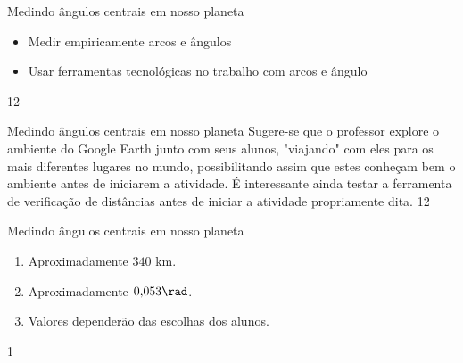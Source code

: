 \clearpage
\def\currentcolor{session2}
\begin{objectives}{Medindo ângulos centrais em nosso planeta}
{
\begin{itemize}
\item Medir empiricamente arcos e ângulos
\item Usar ferramentas tecnológicas no trabalho com arcos e ângulo
\end{itemize}
}{1}{2}
\end{objectives}
\begin{sugestions}{Medindo ângulos centrais em nosso planeta}
{
Sugere-se que o professor explore o ambiente do Google Earth junto com seus alunos, "viajando" com eles para os mais diferentes lugares no mundo, possibilitando assim que estes conheçam bem o ambiente antes de iniciarem a atividade. É interessante ainda testar a ferramenta de verificação de distâncias antes de iniciar a atividade propriamente dita.
}
{1}{2}
\end{sugestions}
\clearmargin
\begin{answer}{Medindo ângulos centrais em nosso planeta}
{
\begin{enumerate}
\item Aproximadamente $340$ km.
\item Aproximadamente $0{,}053\rad$.
\item Valores dependerão das escolhas dos alunos.
\end{enumerate}
}{1}
\end{answer}
\label{trig-prac2}

